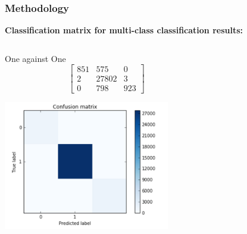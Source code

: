 \documentclass[xcolor={x11names,svgnames,dvipsnames}]{beamer}
\begin{document}
\begin{frame}
\frametitle{Methodology}
\textbf{Classification matrix for multi-class classification results:}\\
\begin{columns}
\column{2.3in}
	\begin{block}{One against One}
\begin{equation*}       
\left[           
  \begin{array}{ccc}   
    851&    575 &    0\\  
     2& 27802& 3\\  
    0  &  798 & 923
  \end{array}
\right]               
\end{equation*}
\begin{center}
     \includegraphics[width=0.8\textwidth, height=0.45\textheight]{one_vs_one.png}
\end{center}
\end{block}
\column{2.3in}


\end{columns}
\end{frame}
\end{document}
